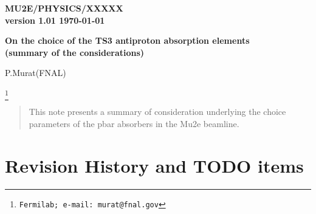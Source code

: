 \documentclass[12pt]{article}
\begin{document}
\begin{titlepage}
  \begin{flushright}
    \bf {MU2E/PHYSICS/XXXXX} \\
    version 1.01
    \today
 \end{flushright}

  \vspace{1cm}

  \begin{center}
    {\Large \bf On the choice of the TS3 antiproton absorption elements \\

      \vspace{0.3in}
      (summary of the considerations)
    }

    \vspace{1cm}
    P.Murat(FNAL)

    \footnote{\texttt{Fermilab; e-mail: murat@fnal.gov}}
    \vspace{0.3cm}

    \vspace{0.8cm}
  \end{center}

  \begin{abstract}
    \vspace{0.2in}
    This note presents a summary of consideration underlying the choice
    parameters of the pbar absorbers in the Mu2e beamline.
  \end{abstract}

\end{titlepage}
%
%
%
{\tableofcontents}

% 


\newpage
\section {Revision History and TODO items}
\end{document}
